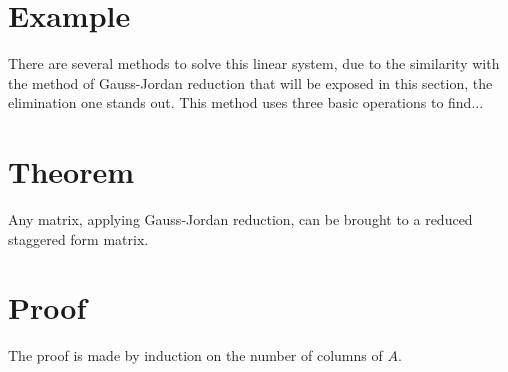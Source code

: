 \section{Example}
\begin{example}  
There are several methods to solve this linear system, due to the similarity with the method of Gauss-Jordan reduction that will be exposed in this section, the elimination one stands out. This method uses three basic operations to find...
\end{example}  
\section{Theorem}
\begin{tcolorbox}
\begin{theorem} \label{T:primerteorema} 
Any matrix, applying Gauss-Jordan reduction, can be brought to a reduced staggered form matrix.
\end{theorem}
\end{tcolorbox}%
\section{Proof}
\begin{Proof}
The proof is made by induction on the number of columns of $A$.
\end{Proof}
